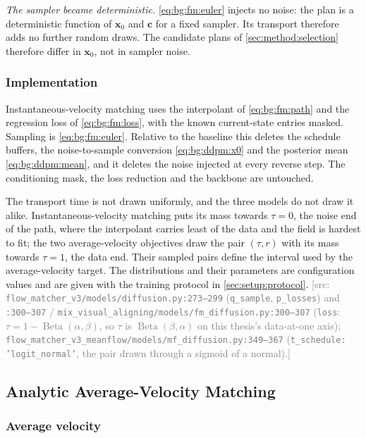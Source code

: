 \documentclass[headsepline,footsepline,footinclude=false,oneside,fontsize=11pt,paper=a4,listof=totoc,bibliography=totoc]{scrbook}
\theoremstyle{definition}
\theoremstyle{plain}
\theoremstyle{remark}
\newcommand{\vect}[1]{\boldsymbol{#1}}
\newcommand{\ftime}{\tau}                      %
\newif\ifsubmission
\newcommand{\srcnote}[1]{\ifsubmission\else\textcolor{gray}{\footnotesize\textsf{[src: #1]}}\fi}
\begin{document}
\emph{The sampler became deterministic.} \eqref{eq:bg:fm:euler} injects no noise: the plan is
a deterministic function of $\vect{x}_{0}$ and $\vect{c}$ for a fixed sampler. Its transport
therefore adds no further random draws. The candidate plans of
\autoref{sec:method:selection} therefore differ in $\vect{x}_{0}$, not in sampler noise.

\subsubsection*{Implementation}

Instantaneous-velocity matching uses the interpolant of \eqref{eq:bg:fm:path} and the regression
loss of \eqref{eq:bg:fm:loss}, with the known current-state entries masked.
Sampling is \eqref{eq:bg:fm:euler}. Relative to the baseline this deletes the schedule buffers,
the noise-to-sample conversion \eqref{eq:bg:ddpm:x0} and the posterior mean
\eqref{eq:bg:ddpm:mean}, and it deletes the noise injected at every reverse step. The
conditioning mask, the loss reduction and the backbone are untouched.

The transport time is not drawn uniformly, and the three models do not draw it alike.
Instantaneous-velocity matching puts its mass towards $\ftime = 0$, the noise end of the path,
where the interpolant carries least of the data and the field is hardest to fit; the two
average-velocity objectives draw the pair $(\ftime,r)$ with its mass towards $\ftime = 1$, the data
end. Their sampled pairs define the interval used by the average-velocity target. The distributions and their parameters
are configuration values and are given with the training protocol in
\autoref{sec:setup:protocol}.
\srcnote{\texttt{flow\_matcher\_v3/models/diffusion.py:273--299}
(\texttt{q\_sample}, \texttt{p\_losses}) and \texttt{:300--307} / \texttt{mix\_visual\_aligning/models/fm\_diffusion.py:300--307}
(\texttt{loss}: $\ftime = 1 - \operatorname{Beta}(\alpha,\beta)$, so $\ftime$ is
$\operatorname{Beta}(\beta,\alpha)$ on this thesis's data-at-one axis);
\texttt{flow\_matcher\_v3\_meanflow/models/mf\_diffusion.py:349--367}
(\texttt{t\_schedule: 'logit\_normal'}, the pair drawn through a sigmoid of a normal).}

\subsection{Analytic Average-Velocity Matching}\label{sec:method:meanflow}

\subsubsection*{Average velocity}
\end{document}
